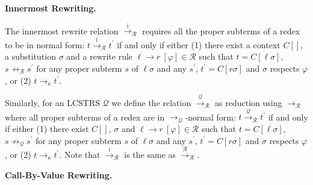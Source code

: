 \documentclass[10pt,a4paper]{amsart}
\begin{document}
 
 
 
 
\par\medskip\noindent\textbf{Innermost Rewriting.}\par
 
 
The innermost rewrite relation $\xrightarrow{\scriptscriptstyle\mathrm{i}}_{\mathcal{R}}$ requires all the proper subterms of a redex to be in normal form: $t\xrightarrow{\scriptscriptstyle\mathrm{i}}_{\mathcal{R}}t^{\prime}$ if and only if either (1) there exist a context ${C}[]$, a substitution $\sigma$ and a rewrite rule ${\ell}\rightarrow{r}\ [\varphi]\in\mathcal{R}$ such that $t={C}[\ell\sigma]$, $s\not\rightarrow_{\mathcal{R}}s^{\prime}$ for any proper subterm $s$ of $\ell\sigma$ and any $s^{\prime}$, $t^{\prime}={C}[r\sigma]$ and $\sigma$ respects $\varphi$, or (2) $t\rightarrow_{\kappa}t^{\prime}$.\par
 
 
 
Similarly, for an LCSTRS $\mathcal{Q}$ we define the relation $\xrightarrow{\scriptscriptstyle\mathcal{Q}}_{\mathcal{R}}$ as reduction using $\rightarrow_{\mathcal{R}}$ where all proper subterms of a redex are in $\rightarrow_{\mathcal{Q}}$-normal form: $t\xrightarrow{\scriptscriptstyle\mathcal{Q}}_{\mathcal{R}}t^{\prime}$ if and only if either (1) there exist ${C}[]$, $\sigma$ and ${\ell}\rightarrow{r}\ [\varphi]\in\mathcal{R}$ such that $t={C}[\ell\sigma]$, $s\not\rightarrow_{\mathcal{Q}}s^{\prime}$ for any proper subterm $s$ of $\ell\sigma$ and any $s^{\prime}$, $t^{\prime}={C}[r\sigma]$ and $\sigma$ respects $\varphi$, or (2) $t\rightarrow_{\kappa}t^{\prime}$. Note that $\xrightarrow{\scriptscriptstyle\mathrm{i}}_{\mathcal{R}}$ is the same as $\xrightarrow{\scriptscriptstyle\mathcal{R}}_{\mathcal{R}}$.\par
 
 
 
 
\par\medskip\noindent\textbf{Call-By-Value Rewriting.}\par
 
\end{document}
